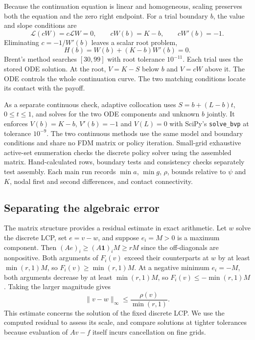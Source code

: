 \documentclass[11pt,a4paper]{article}
\numberwithin{equation}{section}
\begin{document}
Because the continuation equation is linear and homogeneous, scaling
preserves both the equation and the zero right endpoint. For a trial
boundary $b$, the value and slope conditions are
\begin{equation}\label{eq:shooting-match}
 \mathcal L(cW)=c\mathcal LW=0,\qquad
 cW(b)=K-b,\qquad cW'(b)=-1.
\end{equation}
Eliminating $c=-1/W'(b)$ leaves a scalar root problem,
\begin{equation}\label{eq:shooting-root}
 H(b)=W(b)+(K-b)W'(b)=0.
\end{equation}
Brent's method searches $[30,99]$ with root tolerance $10^{-11}$.
Each trial uses the stored ODE solution. At the root, $V=K-S$ below
$b$ and $V=cW$ above it. The ODE controls the whole continuation curve.
The two matching conditions locate its contact with the payoff.

As a separate continuous check, adaptive collocation uses
$S=b+(L-b)t$, $0\le t\le1$, and solves for the two ODE components
and unknown $b$ jointly. It enforces $V(b)=K-b$, $V'(b)=-1$ and
$V(L)=0$ with SciPy's \texttt{solve\_bvp} at tolerance $10^{-9}$.
The two continuous methods use the same model and boundary conditions
and share no FDM matrix or policy iteration. Small-grid exhaustive
active-set enumeration checks the discrete policy solver using the
assembled matrix. Hand-calculated rows, boundary tests and consistency
checks separately test assembly. Each main run records $\min a$,
$\min g$, $\rho$, bounds relative to $\psi$ and $K$, nodal first and
second differences, and contact connectivity.

\subsection{Separating the algebraic error}\label{sec:algebra}
The matrix structure provides a residual estimate in exact arithmetic.
Let $w$ solve the discrete LCP, set $e=v-w$, and suppose $e_i=M>0$
is a maximum component. Then
$(Ae)_i\ge(A\mathbf1)_iM\ge rM$ since the off-diagonals are
nonpositive. Both arguments of $F_i(v)$ exceed their counterparts
at $w$ by at least $\min(r,1)M$, so $F_i(v)\ge\min(r,1)M$.
At a negative minimum $e_i=-M$, both arguments decrease by at least
$\min(r,1)M$, so $F_i(v)\le-\min(r,1)M$. Taking the larger magnitude
gives
\begin{equation}\label{eq:resbound}
 \|v-w\|_\infty\le \frac{\rho(v)}{\min(r,1)}.
\end{equation}
This estimate concerns the solution of the fixed discrete LCP.
We use the computed residual to assess its scale, and compare
solutions at tighter tolerances because evaluation of $Av-f$
itself incurs cancellation on fine grids.
\end{document}
